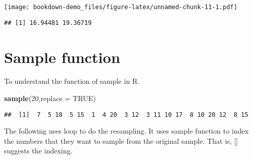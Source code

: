 \documentclass[]{book}
\newenvironment{Shaded}{\begin{snugshade}}{\end{snugshade}}
\newcommand{\ControlFlowTok}[1]{\textcolor[rgb]{0.13,0.29,0.53}{\textbf{#1}}}
\newcommand{\DataTypeTok}[1]{\textcolor[rgb]{0.13,0.29,0.53}{#1}}
\newcommand{\DecValTok}[1]{\textcolor[rgb]{0.00,0.00,0.81}{#1}}
\newcommand{\KeywordTok}[1]{\textcolor[rgb]{0.13,0.29,0.53}{\textbf{#1}}}
\newcommand{\NormalTok}[1]{#1}
\newcommand{\OperatorTok}[1]{\textcolor[rgb]{0.81,0.36,0.00}{\textbf{#1}}}
\newcommand{\OtherTok}[1]{\textcolor[rgb]{0.56,0.35,0.01}{#1}}
\newcommand{\StringTok}[1]{\textcolor[rgb]{0.31,0.60,0.02}{#1}}
\begin{document}
\texttt{[image: bookdown-demo\_files/figure-latex/unnamed-chunk-11-1.pdf]}

\begin{verbatim}
## [1] 16.94481 19.36719
\end{verbatim}

\hypertarget{sample-function}{%
\section{Sample function}\label{sample-function}}

To understand the function of sample in R.

\begin{Shaded}
\begin{Highlighting}[]
\KeywordTok{sample}\NormalTok{(}\DecValTok{20}\NormalTok{,}\DataTypeTok{replace =} \OtherTok{TRUE}\NormalTok{)}
\end{Highlighting}
\end{Shaded}

\begin{verbatim}
##  [1]  7  5 18  5 15  1  4 20  3 12  3 11 10 17  8 10 20 12  8 15
\end{verbatim}

The following uses loop to do the resampling. It uses sample function to index the numbers that they want to sample from the original sample. That is, {[}{]} suggests the indexing.

\begin{Shaded}
\end{Shaded}
\end{document}

